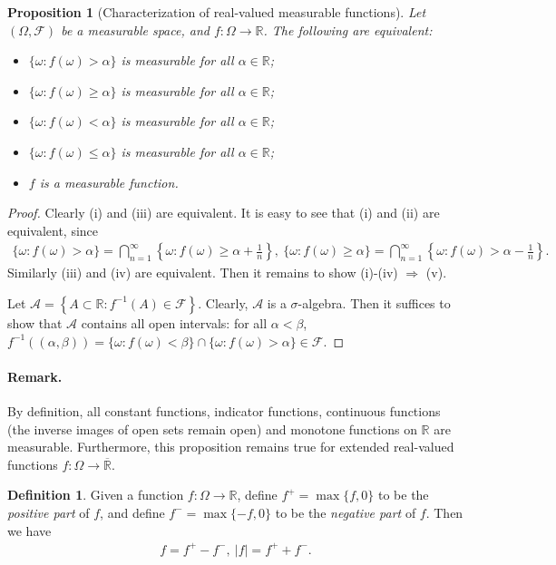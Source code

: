 \documentclass{article}
\numberwithin{equation}{section}
\theoremstyle{plain}
\newtheorem{proposition}[theorem]{Proposition}
\theoremstyle{definition}
\newtheorem{definition}[theorem]{Definition}
\begin{document}
\begin{proposition}[Characterization of real-valued measurable functions]\label{prop:1.31} Let $(\Omega,\mathscr{F})$ be a measurable space, and $f:\Omega\to\mathbb{R}$. The following are equivalent: 
\begin{itemize}
	\item[(i)] $\{\omega:f(\omega)>\alpha\}$ is measurable for all $\alpha\in\mathbb{R}$; 
	\item[(ii)] $\{\omega:f(\omega)\geq\alpha\}$ is measurable for all $\alpha\in\mathbb{R}$; 
	\item[(iii)] $\{\omega:f(\omega)<\alpha\}$ is measurable for all $\alpha\in\mathbb{R}$; 
	\item[(iv)] $\{\omega:f(\omega)\leq\alpha\}$ is measurable for all $\alpha\in\mathbb{R}$; 
	\item[(v)] $f$ is a measurable function.
\end{itemize}
\end{proposition}
\begin{proof}
Clearly (i) and (iii) are equivalent. It is easy to see that (i) and (ii) are equivalent, since
\begin{align*}
	\{\omega:f(\omega)>\alpha\} = \bigcap_{n=1}^\infty\left\{\omega:f(\omega)\geq\alpha+\frac{1}{n}\right\},\ \{\omega:f(\omega)\geq\alpha\} = \bigcap_{n=1}^\infty\left\{\omega:f(\omega)>\alpha-\frac{1}{n}\right\}.
\end{align*}
Similarly (iii) and (iv) are equivalent. Then it remains to show (i)-(iv) $\Rightarrow$ (v).\vspace{0.1cm}

Let $\mathscr{A} = \left\{A\subset\mathbb{R}:f^{-1}(A)\in\mathscr{F}\right\}$. Clearly, $\mathscr{A}$ is a $\sigma$-algebra. Then it suffices to show that $\mathscr{A}$ contains all open intervals: for all $\alpha<\beta$, $f^{-1}((\alpha,\beta)) = \{\omega:f(\omega)<\beta\}\cap\{\omega:f(\omega)>\alpha\}\in\mathscr{F}$.
\end{proof}
\paragraph{Remark.} By definition, all constant functions, indicator functions, continuous functions (the inverse images of open sets remain open) and monotone functions on $\mathbb{R}$ are measurable. Furthermore, this proposition remains true for extended real-valued functions $f:\Omega\to\overline{\mathbb{R}}$.

\begin{definition}\label{def:1.32} Given a function $f:\Omega\to\mathbb{R}$, define $f^+=\max\{f,0\}$ to be the \textit{positive part} of $f$, and define $f^-=\max\{-f,0\}$ to be the \textit{negative part} of $f$. Then we have
\begin{align*}
	f=f^+ - f^-,\ \vert f\vert=f^+ + f^-.
\end{align*}
\end{definition}
\end{document}
